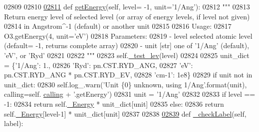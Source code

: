 \begin{DoxyCode}
{{{{{{{{{{{{{{{{{{{{{{02809 
02810 
\hypertarget{pynebcore_8py_source_l02811}{}\hyperlink{classpyneb_1_1core_1_1pynebcore_1_1_rec_atom_a664340029b0a067b459cae45e13d50c5}{02811}     \textcolor{keyword}{def }\hyperlink{classpyneb_1_1core_1_1pynebcore_1_1_rec_atom_a664340029b0a067b459cae45e13d50c5}{getEnergy}(self, level= -1, unit='1/Ang'):
02812         \textcolor{stringliteral}{"""}
02813 \textcolor{stringliteral}{        Return energy level of selected level (or array of energy levels, if level not given) }
02814 \textcolor{stringliteral}{            in Angstrom^-1 (default) or another unit}
02815 \textcolor{stringliteral}{        }
02816 \textcolor{stringliteral}{        Usage:}
02817 \textcolor{stringliteral}{            O3.getEnergy(4, unit='eV')}
02818 \textcolor{stringliteral}{        Parameters:}
02819 \textcolor{stringliteral}{            - level  selected atomic level (default= -1, returns complete array)}
02820 \textcolor{stringliteral}{            - unit   [str] one of '1/Ang' (default), 'eV', or 'Ryd'    }
02821 \textcolor{stringliteral}{            }
02822 \textcolor{stringliteral}{        """}
02823         self.\hyperlink{classpyneb_1_1core_1_1pynebcore_1_1_rec_atom_a271f5e8992df0412c6fdca611ac87a5d}{\_test\_lev}(level)
02824 
02825         unit\_dict = \{\textcolor{stringliteral}{'1/Ang'}: 1.,
02826                      \textcolor{stringliteral}{'Ryd'}: pn.CST.RYD\_ANG,
02827                      \textcolor{stringliteral}{'eV'}: pn.CST.RYD\_ANG * pn.CST.RYD\_EV,
02828                      \textcolor{stringliteral}{'cm-1'}: 1e8\}
02829         \textcolor{keywordflow}{if} unit \textcolor{keywordflow}{not} \textcolor{keywordflow}{in} unit\_dict:
02830             self.log\_.warn(\textcolor{stringliteral}{'Unit \{0\} unknown, using 1/Ang'}.format(unit), calling=self.
      \hyperlink{classpyneb_1_1core_1_1pynebcore_1_1_rec_atom_a82ec425ebba32b73a5d9ae52717d47c4}{calling} + \textcolor{stringliteral}{'.getEnergy'})
02831             unit = \textcolor{stringliteral}{'1/Ang'}        
02832         
02833         \textcolor{keywordflow}{if} level == -1:
02834             \textcolor{keywordflow}{return} self.\hyperlink{classpyneb_1_1core_1_1pynebcore_1_1_rec_atom_a652daa9311973780fd44f61e09bc650f}{\_Energy} * unit\_dict[unit]
02835         \textcolor{keywordflow}{else}:
02836             \textcolor{keywordflow}{return} self.\hyperlink{classpyneb_1_1core_1_1pynebcore_1_1_rec_atom_a652daa9311973780fd44f61e09bc650f}{\_Energy}[level-1] * unit\_dict[unit]
02837 
02838     
\hypertarget{pynebcore_8py_source_l02839}{}\hyperlink{classpyneb_1_1core_1_1pynebcore_1_1_rec_atom_adcc9c72bd96e9064b01591d8b32112ea}{02839}     \textcolor{keyword}{def }\hyperlink{classpyneb_1_1core_1_1pynebcore_1_1_rec_atom_adcc9c72bd96e9064b01591d8b32112ea}{\_checkLabel}(self, label):
}}}}}}}}}}}}}}}}}}}}}}
\end{DoxyCode}
